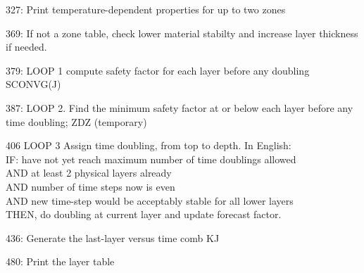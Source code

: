 \documentclass{article}
\newcommand{\qi}{\\ \hspace*{2.em}}      %
\begin{document}
327: Print temperature-dependent properties for up to two zones 

369: If not a zone table, check lower material stabilty and increase layer
thickness if needed.

379: LOOP 1 compute safety factor for each layer before any doubling SCONVG(J)

387: LOOP 2. Find the minimum safety factor at or below each layer before any
time doubling; ZDZ (temporary)

406 LOOP 3 Assign time doubling, from top to depth. In English: 
\qi IF:  have not yet reach maximum number of time doublings allowed 
\qi AND at least 2 physical layers already 
\qi AND number of time steps now is even
\qi AND new time-step would be acceptably stable for all lower layers
\\ THEN, do doubling at current layer and update forecast factor.

436: Generate the last-layer versus time comb KJ

480: Print the layer table
\end{document}
